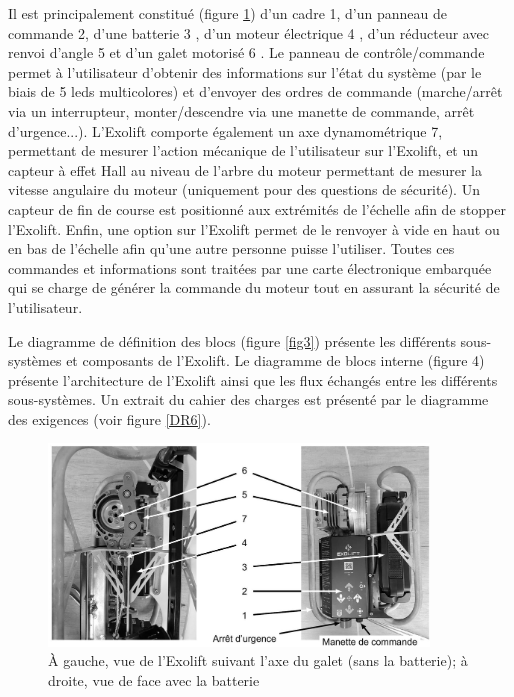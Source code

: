 Il est principalement constitué (figure \ref{fig2}) d'un cadre 1, d'un panneau de commande 2, d'une batterie 3 , d'un moteur électrique 4 , d'un réducteur avec renvoi d'angle 5 et d'un galet motorisé 6 . Le panneau de contrôle/commande permet à l'utilisateur d'obtenir des informations sur l'état du système (par le biais de 5 leds multicolores) et d'envoyer des ordres de commande (marche/arrêt via un interrupteur, monter/descendre via une manette de commande, arrêt d'urgence...). L'Exolift comporte également un axe dynamométrique 7, permettant de mesurer l'action mécanique de l'utilisateur sur l'Exolift, et un capteur à effet Hall au niveau de l'arbre du moteur permettant de mesurer la vitesse angulaire du moteur (uniquement pour des questions de sécurité). Un capteur de fin de course est positionné aux extrémités de l'échelle afin de stopper l'Exolift. Enfin, une option sur l'Exolift permet de le renvoyer à vide en haut ou en bas de l'échelle afin qu'une autre personne puisse l'utiliser. Toutes ces commandes et informations sont traitées par une carte électronique embarquée qui se charge de générer la commande du moteur tout en assurant la sécurité de l'utilisateur.

Le diagramme de définition des blocs (figure \ref{fig3}) présente les différents sous-systèmes et composants de l'Exolift. Le diagramme de blocs interne (figure 4) présente l'architecture de l'Exolift ainsi que les flux échangés entre les différents sous-systèmes. Un extrait du cahier des charges est présenté par le diagramme des exigences (voir figure \ref{DR6}).


\begin{figure}[!htb]
\begin{center}
\includegraphics[width=0.9\textwidth]{images/2023_10_30_d11e80da56f59e3b3cdfg-03}
\caption{À gauche, vue de l'Exolift suivant l'axe du galet (sans la batterie); à droite, vue de face avec la batterie \label{fig2}}
\end{center}
\end{figure}


